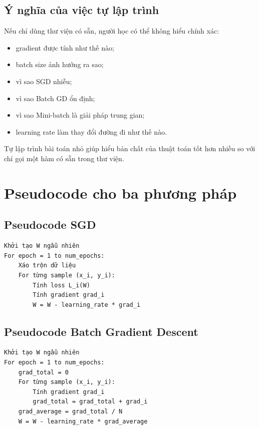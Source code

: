 \documentclass[12pt,a4paper]{report}
\begin{document}
\section{Ý nghĩa của việc tự lập trình}

Nếu chỉ dùng thư viện có sẵn, người học có thể không hiểu chính xác:

\begin{itemize}
    \item gradient được tính như thế nào;
    \item batch size ảnh hưởng ra sao;
    \item vì sao SGD nhiễu;
    \item vì sao Batch GD ổn định;
    \item vì sao Mini-batch là giải pháp trung gian;
    \item learning rate làm thay đổi đường đi như thế nào.
\end{itemize}

\begin{ghinho}
Tự lập trình bài toán nhỏ giúp hiểu bản chất của thuật toán tốt hơn nhiều so với chỉ gọi một hàm có sẵn trong thư viện.
\end{ghinho}

\chapter{Pseudocode cho ba phương pháp}

\section{Pseudocode SGD}

\begin{verbatim}
Khởi tạo W ngẫu nhiên
For epoch = 1 to num_epochs:
    Xáo trộn dữ liệu
    For từng sample (x_i, y_i):
        Tính loss L_i(W)
        Tính gradient grad_i
        W = W - learning_rate * grad_i
\end{verbatim}

\section{Pseudocode Batch Gradient Descent}

\begin{verbatim}
Khởi tạo W ngẫu nhiên
For epoch = 1 to num_epochs:
    grad_total = 0
    For từng sample (x_i, y_i):
        Tính gradient grad_i
        grad_total = grad_total + grad_i
    grad_average = grad_total / N
    W = W - learning_rate * grad_average
\end{verbatim}
\end{document}
